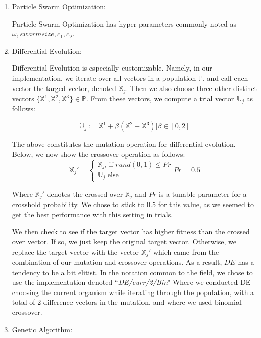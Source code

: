 \documentclass[twoside,11pt]{article}
\begin{document}
\begin{enumerate}
\item Particle Swarm Optimization:

	Particle Swarm Optimization has hyper parameters commonly noted as $\omega, swarmsize, c_1, c_2$.

\item Differential Evolution:

	Differential Evolution is especially customizable. Namely, in our implementation, we iterate over all vectors in a population $\mathbb{P}$, and call each vector
		the targed vector, denoted $\mathbb{X}_j$. Then we also choose three other distinct vectors $\{\mathbb{X}^1, \mathbb{X}^2, \mathbb{X}^3\}\in \mathbb{P}$.
		From these vectors, we compute a trial vector $\mathbb{U}_j$ as follows:

		\begin{equation}
			\mathbb{U}_j := \mathbb{X}^1 + \beta(\mathbb{X}^2 - \mathbb{X}^3) | \beta \in [0,2]
		\end{equation}

		The above constitutes the mutation operation for differential evolution. Below, we now show the crossover operation as follows:
		\begin{equation}
		\mathbb{X}_j'=
		\begin{cases}
			\mathbb{X}_{ji} \text{ if } rand(0,1)\leq Pr \\
			\mathbb{U}_j \text{ else}
		\end{cases}
		Pr = 0.5
		\end{equation}

		Where $\mathbb{X}_j'$ denotes the crossed over $\mathbb{X}_j$ and $Pr$ is a tunable parameter for a crosshold probability. We chose to stick to $0.5$ for this
		value, as we seemed to get the best performance with this setting in trials.

		We then check to see if the target vector has higher fitness than the crossed over vector. If so, we just keep the original target vector. Otherwise, we replace
		the target vector with the vector $\mathbb{X}_j'$ which came from the combination of our mutation and crossover operations. As a result, $DE$ has a tendency to
		be a bit elitist. In the notation common to the field, we chose to use the implementation denoted ``\textit{DE/curr/2/Bin}" Where we conducted DE choosing the 
		current organism while iterating through the population, with a total of 2 difference vectors in the mutation, and where we used binomial crossover.

\item Genetic Algorithm:


\end{enumerate}
\end{document}
